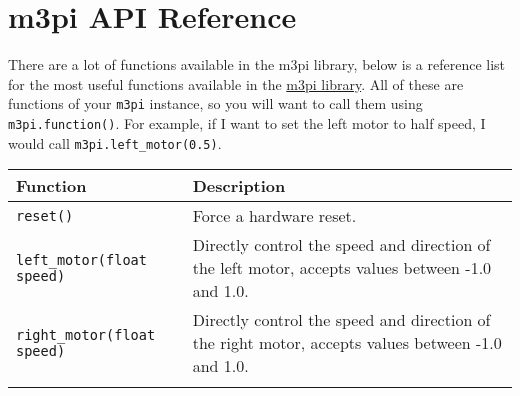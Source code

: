 \section{m3pi API Reference}\label{m3pi-api-reference}

There are a lot of functions available in the m3pi library, below is a
reference list for the most useful functions available in the
\href{https://os.mbed.com/users/chris/code/m3pi/docs/4b7d6ea9b35b/classm3pi.html}{m3pi
library}. All of these are functions of your \lstinline!m3pi! instance,
so you will want to call them using \lstinline!m3pi.function()!. For
example, if I want to set the left motor to half speed, I would call
\lstinline!m3pi.left_motor(0.5)!.

\begin{longtable}[]{@{}ll@{}}
\toprule
\begin{minipage}[b]{0.30\columnwidth}\raggedright\strut
Function\strut
\end{minipage} & \begin{minipage}[b]{0.65\columnwidth}\raggedright\strut
Description\strut
\end{minipage}\tabularnewline
\midrule
\endhead
\begin{minipage}[t]{0.30\columnwidth}\raggedright\strut
\lstinline!reset()!\strut
\end{minipage} & \begin{minipage}[t]{0.65\columnwidth}\raggedright\strut
Force a hardware reset.\strut
\end{minipage}\tabularnewline
\begin{minipage}[t]{0.30\columnwidth}\raggedright\strut
\lstinline!left_motor(float speed)!\strut
\end{minipage} & \begin{minipage}[t]{0.65\columnwidth}\raggedright\strut
Directly control the speed and direction of the left motor, accepts
values between -1.0 and 1.0.\strut
\end{minipage}\tabularnewline
\begin{minipage}[t]{0.30\columnwidth}\raggedright\strut
\lstinline!right_motor(float speed)!\strut
\end{minipage} & \begin{minipage}[t]{0.65\columnwidth}\raggedright\strut
Directly control the speed and direction of the right motor, accepts
values between -1.0 and 1.0.\strut
\end{minipage}\tabularnewline
\begin{minipage}[t]{0.30\columnwidth}\raggedright\strut

\end{minipage}
\end{longtable}
